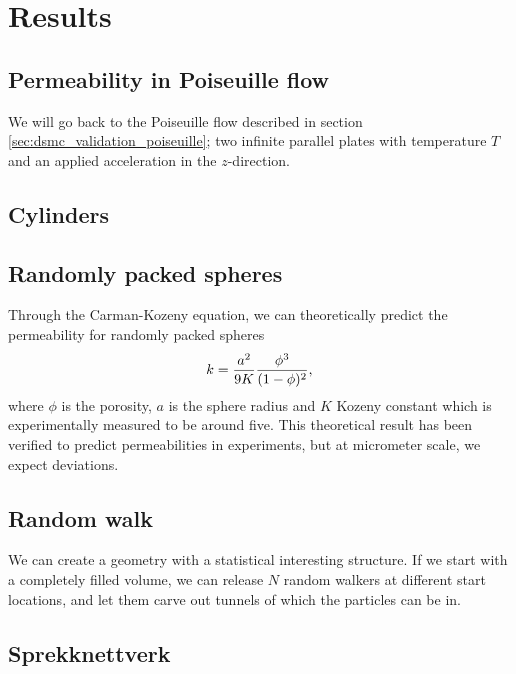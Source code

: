 \section{Results}

\subsection{Permeability in Poiseuille flow}
We will go back to the Poiseuille flow described in section \ref{sec:dsmc_validation_poiseuille}; two infinite parallel plates with temperature $T$ and an applied acceleration in the $z$-direction. 

\subsection{Cylinders}

\subsection{Randomly packed spheres}
Through the Carman-Kozeny equation, we can theoretically predict the permeability for randomly packed spheres 
\begin{align}
	k = {a^2 \over 9K} {\phi^3 \over (1 - \phi)^2},
\end{align}
where $\phi$ is the porosity, $a$ is the sphere radius and $K$ Kozeny constant which is experimentally measured to be around five\cite{carman1937fluid}. This theoretical result has been verified to predict permeabilities in experiments, but at micrometer scale, we expect deviations. 

\subsection{Random walk}
We can create a geometry with a statistical interesting structure. If we start with a completely filled volume, we can release $N$ random walkers at different start locations, and let them carve out tunnels of which the particles can be in. 
\subsection{Sprekknettverk}
